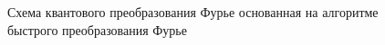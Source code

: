 \begin{figure}
\centering



\caption{Схема квантового преобразования Фурье основанная на алгоритме
быстрого преобразования Фурье}
\label{figQuantCompQuantFourier}
\end{figure}
